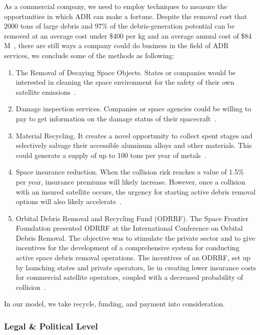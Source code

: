 \documentclass{mcmthesis}
\begin{document}
	As a commercial company, we need to employ techniques to measure the opportunities in which ADR can make a fortune. Despite the removal cost that 2000 tons of large debris and 97\% of the debris-generation potential can be removed at an average cost under \$400 per kg and an average	annual cost of \$84 M~\cite{Pearson}, there are still ways a company could do business in the field of ADR services, we conclude some of the methods as following:
	
	\begin{enumerate}
		\item The Removal of Decaying Space Objects. States or companies would be interested in cleaning the space environment for the safety of their own satellite emissions~\cite{Oliver}.
		\item Damage inspection services. Companies or space agencies could be willing to pay to get information on the damage status of their spacecraft~\cite{Oliver}.
		\item Material Recycling. It creates a novel opportunity to collect spent stages and selectively salvage their accessible aluminum alloys and other materials. This could generate a supply of up to 100 tons per year of metals~\cite{Pearson}.
		\item Space insurance reduction. When the collision risk reaches a value of 1.5\% per year, insurance premiums will likely increase. However, once a collision with an insured satellite occurs, the urgency for starting active debris removal options will also likely accelerate~\cite{McKnight}.
		\item Orbital Debris Removal and Recycling Fund (ODRRF). The Space Frontier Foundation presented ODRRF at the International Conference on Orbital Debris Removal. The objective was to stimulate the private sector and to give incentives for the development of a comprehensive system for conducting active space debris removal operations. The incentives of an ODRRF, set up by launching states and private operators, lie in creating lower insurance costs for commercial satellite operators, coupled with a decreased probability of collision~\cite{Lehnert}.
	\end{enumerate}
	
	In our model, we take recycle, funding, and payment into consideration.
	
\subsubsection{Legal \& Political Level}
	
\end{document}
